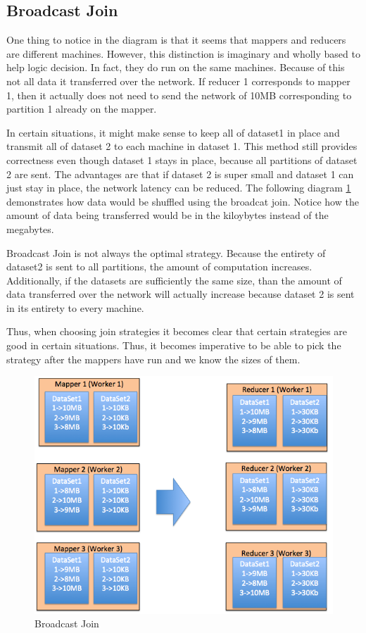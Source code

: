 \subsection {Broadcast Join}
 One thing to notice in the diagram is that it seems that mappers and reducers
are different machines. However, this distinction is imaginary and wholly based to help 
logic decision. In fact, they do run on the same machines. 
Because of this not all data it transferred over the network. If reducer 1 corresponds to mapper 1, then it
actually does not need to send the network of 10MB corresponding to partition 1 already on the mapper.

In certain situations, it might make sense to keep all of dataset1 in place and transmit all of dataset 2 to each
machine in dataset 1. This method still provides correctness even though dataset 1 stays in place, because all partitions
of dataset 2 are sent. The advantages are that if dataset 2 is super small and dataset 1 can just stay in place, 
the network latency can be reduced. The following diagram \ref{fig:broadcast_join} demonstrates how data would be shuffled
using the broadcat join. Notice how the amount of data being transferred would be in the kiloybytes instead of the megabytes.

Broadcast Join is not always the optimal strategy. Because the entirety of dataset2 is sent to all partitions, the amount of computation
increases. Additionally, if the datasets are sufficiently the same size, than the amount of data transferred over the network will actually
increase because dataset 2 is sent in its entirety to every machine. 

Thus, when choosing join strategies it becomes clear that certain strategies are good in certain situations. Thus, it becomes imperative
to be able to pick the strategy after the mappers have run and we know the sizes of them.

 \begin{figure}[h]
\begin{center}
\includegraphics[scale=1.0]{./img/broadcast_join.png}
\caption{Broadcast Join}
\label{fig:broadcast_join}
\end{center}
\end{figure}



